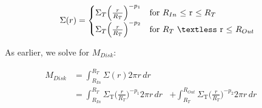 \begin{equation}\label{eq:sigmaDP}
\Sigma(r) = \begin{cases}
   \Sigma_{T}\Big(\frac{r}{R_{T}}\Big)^{-p_{1}} & \text{for $R_{In}$ $\le$ r $\le R_{T}$} \\
   \Sigma_{T}\Big(\frac{r}{R_{T}}\Big)^{-p_{2}} & \text{for $R_{T}$ $\textless$ r $\le$ $R_{Out}$}
\end{cases}
\end{equation}

As earlier, we solve for $M_{Disk}$:

\begin{equation}\label{eq:mdiskDP}
\begin{flalign*}
    M_{Disk} &= \int_{R_{In}}^{R_{T}} \Sigma(r) 2 \pi r \,dr & \\
    &= \int_{R_{In}}^{R_{T}} \Sigma_{\text{T}}\Big(\frac{r}{R_{T}}\Big)^{-p_{1}} 2 \pi r \,dr & + \int_{R_{T}}^{R_{Out}} \Sigma_{\text{T}}\Big(\frac{r}{R_{T}}\Big)^{-p_{2}} 2 \pi r \,dr &&
\end{flalign*}
\end{equation}

